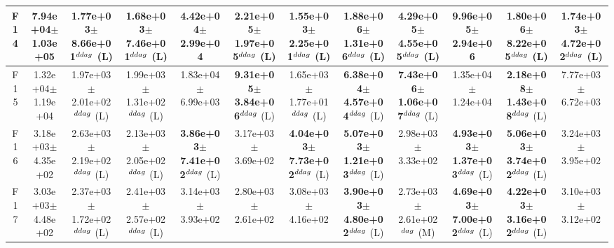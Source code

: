 \begin{table}[!t]
\begin{tabular}{c|ccccccccccc}
F14  & 7.94e+04$\pm$1.03e+05  & 1.77e+03$\pm$8.66e+01$^{\\ddag}$ (L)  & 1.68e+03$\pm$7.46e+01$^{\\ddag}$ (L)  & 4.42e+04$\pm$2.99e+04   & \textbf{2.21e+05$\pm$1.97e+05}$^{\\ddag}$ (L)  & 1.55e+03$\pm$2.25e+01$^{\\ddag}$ (L)  & \textbf{1.88e+06$\pm$1.31e+06}$^{\\ddag}$ (L)  & \textbf{4.29e+05$\pm$4.55e+05}$^{\\ddag}$ (L)  & 9.96e+05$\pm$2.94e+06   & \textbf{1.80e+06$\pm$8.22e+05}$^{\\ddag}$ (L)  & 1.74e+03$\pm$4.72e+02$^{\\ddag}$ (L) \\ \hline
F15  & 1.32e+04$\pm$1.19e+04  & 1.97e+03$\pm$2.01e+02$^{\\ddag}$ (L)  & 1.99e+03$\pm$1.31e+02$^{\\ddag}$ (L)  & 1.83e+04$\pm$6.99e+03   & \textbf{9.31e+05$\pm$3.84e+06}$^{\\ddag}$ (L)  & 1.65e+03$\pm$1.77e+01$^{\\ddag}$ (L)  & \textbf{6.38e+04$\pm$4.57e+04}$^{\\ddag}$ (L)  & \textbf{7.43e+06$\pm$1.06e+07}$^{\\ddag}$ (L)  & 1.35e+04$\pm$1.24e+04   & \textbf{2.18e+08$\pm$1.43e+08}$^{\\ddag}$ (L)  & 7.77e+03$\pm$6.72e+03  \\ \hline
F16  & 3.18e+03$\pm$4.35e+02  & 2.63e+03$\pm$2.19e+02$^{\\ddag}$ (L)  & 2.13e+03$\pm$2.05e+02$^{\\ddag}$ (L)  & \textbf{3.86e+03$\pm$7.41e+02}$^{\\ddag}$ (L)  & 3.17e+03$\pm$3.69e+02   & \textbf{4.04e+03$\pm$7.73e+02}$^{\\ddag}$ (L)  & \textbf{5.07e+03$\pm$1.21e+03}$^{\\ddag}$ (L)  & 2.98e+03$\pm$3.33e+02   & \textbf{4.93e+03$\pm$1.37e+03}$^{\\ddag}$ (L)  & \textbf{5.06e+03$\pm$3.74e+02}$^{\\ddag}$ (L)  & 3.24e+03$\pm$3.95e+02  \\ \hline
F17  & 3.03e+03$\pm$4.48e+02  & 2.37e+03$\pm$1.72e+02$^{\\ddag}$ (L)  & 2.41e+03$\pm$2.57e+02$^{\\ddag}$ (L)  & 3.14e+03$\pm$3.93e+02   & 2.80e+03$\pm$2.61e+02   & 3.08e+03$\pm$4.16e+02   & \textbf{3.90e+03$\pm$4.80e+02}$^{\\ddag}$ (L)  & 2.73e+03$\pm$2.61e+02$^{\\dag}$ (M)  & \textbf{4.69e+03$\pm$7.00e+02}$^{\\ddag}$ (L)  & \textbf{4.22e+03$\pm$3.16e+02}$^{\\ddag}$ (L)  & 3.10e+03$\pm$3.12e+02  \\ \hline

\end{tabular}
\end{table}
